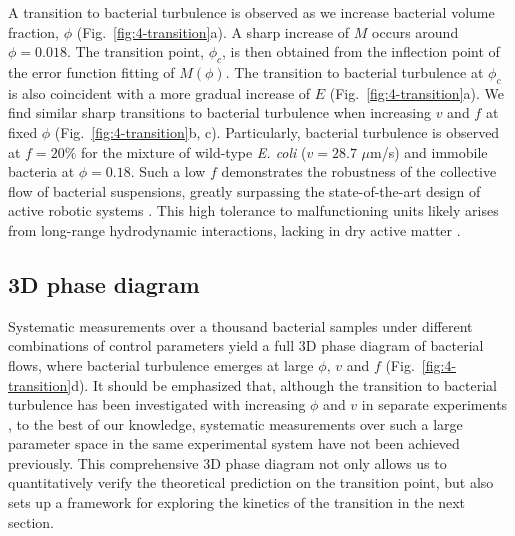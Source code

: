 A transition to bacterial turbulence is observed as we increase bacterial volume fraction, $\phi$ (Fig.~\ref{fig:4-transition}a). A sharp increase of $M$ occurs around $\phi = 0.018$. The transition point, $\phi_c$, is then obtained from the inflection point of the error function fitting of $M(\phi)$. The transition to bacterial turbulence at $\phi_c$ is also coincident with a more gradual increase of $E$ (Fig.~\ref{fig:4-transition}a).
We find similar sharp transitions to bacterial turbulence when increasing $v$ and $f$ at fixed $\phi$ (Fig.~\ref{fig:4-transition}b, c).
Particularly, bacterial turbulence is observed at $f = 20\%$ for the mixture of wild-type \textit{E. coli} ($v = 28.7$ $\mu$m/s) and immobile bacteria at $\phi = 0.18$. Such a low $f$ demonstrates the robustness of the collective flow of bacterial suspensions, greatly surpassing the state-of-the-art design of active robotic systems \cite{Li2019a}.
This high tolerance to malfunctioning units likely arises from long-range hydrodynamic interactions, lacking in dry active matter \cite{Marchetti2013}.

\subsection{3D phase diagram}
Systematic measurements over a thousand bacterial samples under different combinations of control parameters yield a full 3D phase diagram of bacterial flows, where bacterial turbulence emerges at large $\phi$, $v$ and $f$ (Fig.~\ref{fig:4-transition}d).
It should be emphasized that, although the transition to bacterial turbulence has been investigated with increasing $\phi$ and $v$ in separate experiments \cite{Cisneros2011, Sokolov2007, Sokolov2009, Sokolov2012, Ryan2013}, to the best of our knowledge, systematic measurements over such a large parameter space in the same experimental system have not been achieved previously. This comprehensive 3D phase diagram not only allows us to quantitatively verify the theoretical prediction on the transition point, but also sets up a framework for exploring the kinetics of the transition in the next section.


